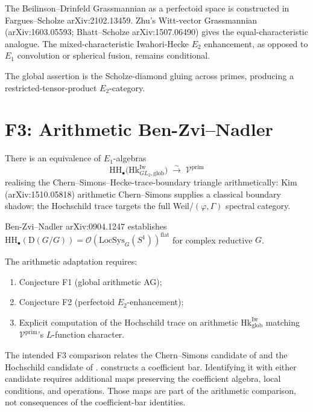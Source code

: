 \begin{remark}[form]
The Beilinson--Drinfeld Grassmannian as
a perfectoid space is constructed in Fargues--Scholze
arXiv:2102.13459. Zhu's Witt-vector Grassmannian
(arXiv:1603.05593; Bhatt--Scholze arXiv:1507.06490) gives the
equal-characteristic analogue. The mixed-characteristic
Iwahori-Hecke \(E_{2}\) enhancement, as opposed to \(E_{1}\) convolution
or spherical fusion, remains conditional.

The global assertion is the Scholze-diamond gluing across primes,
producing a restricted-tensor-product \(E_{2}\)-category.
\end{remark}

\section{F3: Arithmetic Ben-Zvi--Nadler}
\label{v4-arith:of:F3}

\begin{conjecture}
\label{v4-arith:conj:F3-arith-BZN}
There is an equivalence of \(E_{1}\)-algebras
\begin{equation}
\mathrm{HH}_{\bullet}\bigl(\mathrm{Hk}^{\mathrm{Iw}}_{GL_{2},\mathrm{glob}}\bigr)\;\xrightarrow{\sim}\;\mathcal{V}^{\mathrm{prim}}
\end{equation}
realising the Chern--Simons--Hecke-trace-boundary triangle arithmetically:
Kim (arXiv:1510.05818) arithmetic Chern--Simons supplies a classical
boundary shadow; the Hochschild trace targets the full
Weil/\((\varphi,\Gamma)\) spectral category.
\end{conjecture}

\begin{remark}[form]
Ben-Zvi--Nadler
arXiv:0904.1247 establishes
\(\mathrm{HH}_{\bullet}(\mathrm{D}(G/G))=\mathcal{O}(\mathrm{LocSys}_{G}(S^{1}))^{\mathrm{flat}}\)
for complex reductive \(G\).

The arithmetic adaptation requires:
\begin{enumerate}
\item Conjecture F1 (global arithmetic AG);
\item Conjecture F2 (perfectoid \(E_{2}\)-enhancement);
\item Explicit computation of the Hochschild trace on arithmetic
\(\mathrm{Hk}^{\mathrm{Iw}}_{\mathrm{glob}}\) matching \(\mathcal{V}^{\mathrm{prim}}\)'s
\(L\)-function character.
\end{enumerate}

The intended F3 comparison relates the Chern--Simons candidate
of  and the Hochschild
candidate of .
 constructs a coefficient bar.
Identifying it with either candidate requires additional maps
preserving the coefficient algebra, local conditions, and operations.
Those maps are part of the arithmetic comparison, not consequences
of the coefficient-bar identities.
\end{remark}

